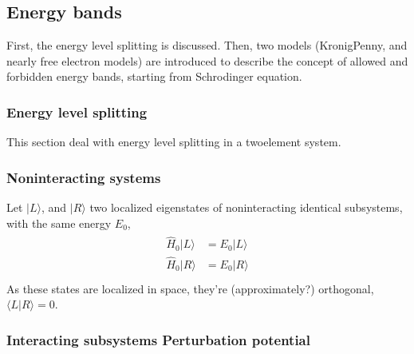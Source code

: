 \documentclass[letterpaper,10pt,english]{jupyterBook}
\begin{document}
\subsection{Energy bands}
\label{\detokenize{ch/solid-state/semiconductors-solids-qm:energy-bands}}\label{\detokenize{ch/solid-state/semiconductors-solids-qm:semiconductors-solids-qm-energy-bands}}
\sphinxAtStartPar
First, the energy level splitting is discussed. Then, two models (Kronig\sphinxhyphen{}Penny, and nearly free electron models) are introduced to describe the concept of allowed and forbidden energy bands, starting from Schrodinger equation.


\subsubsection{Energy level splitting}
\label{\detokenize{ch/solid-state/semiconductors-solids-qm:energy-level-splitting}}
\sphinxAtStartPar
This section deal with energy level splitting in a two\sphinxhyphen{}element system.
\subsubsection*{Non\sphinxhyphen{}interacting systems}

\sphinxAtStartPar
Let \(| L \rangle\), and \(| R \rangle\) two localized eigen\sphinxhyphen{}states of non\sphinxhyphen{}interacting identical subsystems, with the same energy \(E_0\),
\begin{equation*}
\begin{split}\begin{aligned}
  \hat{H}_0 | L \rangle & = E_0 | L \rangle  \\
  \hat{H}_0 | R \rangle & = E_0 | R \rangle  \\
\end{aligned}\end{split}
\end{equation*}
\sphinxAtStartPar
As these states are localized in space, they’re (approximately?) orthogonal, \(\langle L | R \rangle = 0\).
\subsubsection*{Interacting subsystems \sphinxhyphen{} Perturbation potential}
\end{document}
